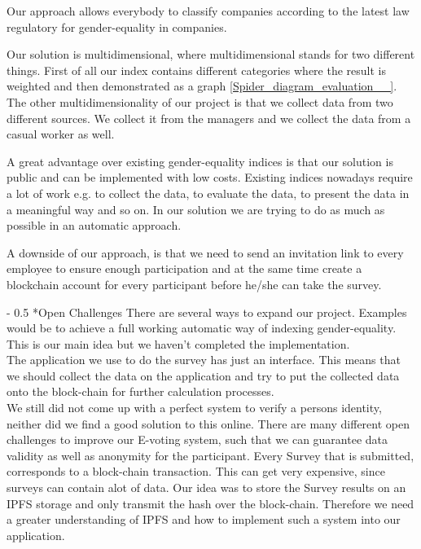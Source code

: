 \documentclass[portrait,a4paper]{article}
\makeatletter
\renewcommand\paragraph{\@startsection{paragraph}{4}{0mm}%
	{-\baselineskip}%
	{0.5\baselineskip}%
	{\normalfont\bfseries}%
}%
\makeatother
\begin{document}
		Our approach allows everybody to classify companies according to the latest law regulatory for gender-equality in companies.
		
		Our solution is multidimensional, where multidimensional stands for two different things. 
		First of all our index contains different categories where the result is weighted and then demonstrated 
		as a graph \ref{Spider_diagram_evaluation__}.
		The other multidimensionality of our project is that we collect data from two different sources. 
		We collect it from the managers and we collect the data from a casual worker as well.
		
		A great advantage over existing gender-equality indices is that our solution is public and can be implemented
		with low costs. Existing indices nowadays require a lot of work e.g. to collect the data, to evaluate the data, 
		to present the data in a meaningful way and so on. In our solution we are trying to do as much as possible in an automatic approach.
		
		A downside of our approach, is that we need to send an invitation link to every employee to ensure enough participation and
		at the same time create a blockchain account for every participant before he/she can take the survey.

	\paragraph*{Open Challenges}
		There are several ways to expand our project. Examples would be to achieve a full working automatic way of 
		indexing gender-equality. This is our main idea but we haven't completed the implementation.\\
		The application we use to do the survey has just an interface. This means that we should collect the data on 
		the application and try to put the collected data onto the block-chain for further calculation processes.\\
		We still did not come up with a perfect system to verify a persons identity, neither did we find a good solution to
		this online. There are many different open challenges to improve our E-voting system, such that we can guarantee data 
		validity as well as anonymity for the participant.
		Every Survey that is submitted, corresponds to a block-chain transaction. This can get very expensive, since surveys can 
		contain alot of data. Our idea was to store the Survey results on an IPFS storage and only transmit the hash over the 
		block-chain. Therefore we need a greater understanding of IPFS and how to implement such a system into our application.
		
\end{document}
